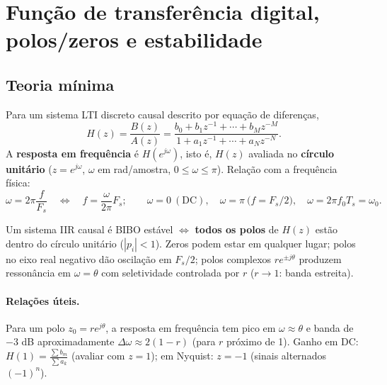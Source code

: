 \section{Função de transferência digital, polos/zeros e estabilidade}\label{sec:ftdig}

\subsection*{Teoria mínima}

Para um sistema LTI discreto causal descrito por equação de diferenças,
\[
  H(z)=\frac{B(z)}{A(z)}
  =\frac{b_0+b_1z^{-1}+\cdots+b_Mz^{-M}}{1+a_1z^{-1}+\cdots+a_Nz^{-N}} .
\]
A \textbf{resposta em frequência} é $H(e^{j\omega})$, isto é, $H(z)$ avaliada
no \textbf{círculo unitário} ($z=e^{j\omega}$, $\omega$ em rad/amostra,
$0\le\omega\le\pi$). Relação com a frequência física:
\[
  \omega=2\pi\frac{f}{F_s}\quad\Longleftrightarrow\quad
  f=\frac{\omega}{2\pi}F_s;\qquad \omega=0\ (\text{DC}),\quad
  \omega=\pi\ \bigl(f=F_s/2\bigr),\quad
  \omega=2\pi f_0T_s=\omega_0 .
\]

\begin{teo}[estabilidade]
Um sistema IIR causal é BIBO estável $\iff$ \textbf{todos os polos} de $H(z)$
estão dentro do círculo unitário ($|p_i|<1$). Zeros podem estar em qualquer
lugar; polos no eixo real negativo dão oscilação em $F_s/2$; polos complexos
$re^{\pm j\theta}$ produzem ressonância em $\omega=\theta$ com seletividade
controlada por $r$ ($r\to1$: banda estreita).
\end{teo}

\paragraph{Relações úteis.} Para um polo $z_0=re^{j\theta}$, a resposta em
frequência tem pico em $\omega\approx\theta$ e banda de $-3$ dB
aproximadamente $\Delta\omega\approx2(1-r)$ (para $r$ próximo de 1). Ganho em
DC: $H(1)=\frac{\sum b_m}{\sum a_k}$ (avaliar com $z=1$); em Nyquist:
$z=-1$ (sinais alternados $(-1)^n$).


